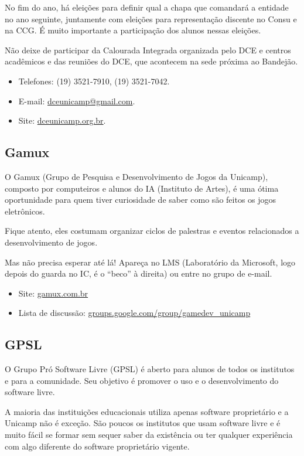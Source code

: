No fim do ano, há eleições para definir qual
a chapa que comandará a entidade no ano seguinte, juntamente com eleições para
representação discente no Consu e na CCG. É muito importante a participação dos
alunos nessas eleições.

Não deixe de participar da Calourada Integrada organizada pelo DCE e centros
acadêmicos e das reuniões do DCE, que acontecem na sede próxima ao Bandejão.

\begin{itemize}
\item  Telefones: (19) 3521-7910, (19) 3521-7042.
\item  E-mail: \url{dceunicamp@gmail.com}.
\item  Site: \url{dceunicamp.org.br}.
\end{itemize}

\subsection{Gamux}

O Gamux (Grupo de Pesquisa e Desenvolvimento de Jogos da Unicamp), composto por
computeiros e alunos do IA (Instituto de Artes), é uma ótima oportunidade para
quem tiver curiosidade de saber como são feitos os jogos eletrônicos.

Fique atento, eles costumam organizar ciclos de palestras e eventos relacionados
a desenvolvimento de jogos.

Mas não precisa esperar até lá! Apareça no LMS (Laboratório da Microsoft, logo
depois do guarda no IC, é o ``beco'' à direita) ou entre no grupo de
e-mail.

\begin{itemize}
\item  Site: \url{gamux.com.br}
\item  Lista de discussão: \url{groups.google.com/group/gamedev_unicamp}
\end{itemize}

\subsection{GPSL}

O Grupo Pró Software Livre (GPSL) é aberto para alunos de todos os institutos
e para a comunidade. Seu objetivo é promover o uso e o desenvolvimento do
software livre.

A maioria das instituições educacionais utiliza apenas software
proprietário e a Unicamp não é exceção. São poucos os institutos que usam
software livre e é muito fácil se formar sem sequer saber da existência ou ter
qualquer experiência com algo diferente do software proprietário vigente.

